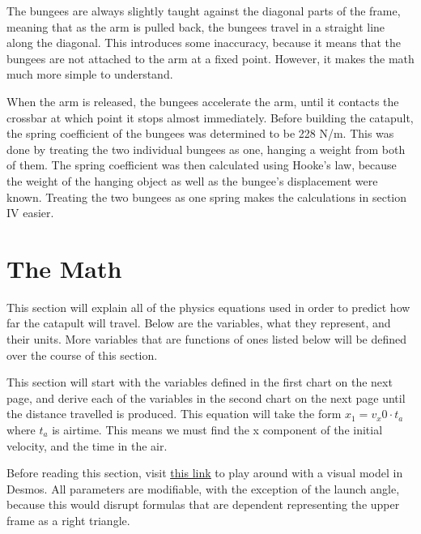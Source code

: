 \documentclass[10pt]{article}
\begin{document}
\begin{flushleft}
    \par
    The bungees are always slightly taught against the diagonal parts of the frame, meaning that as the arm is pulled back, the bungees travel in a straight line along the diagonal.
    This introduces some inaccuracy, because it means that the bungees are not attached to the arm at a fixed point.
    However, it makes the math much more simple to understand.

    \par
    When the arm is released, the bungees accelerate the arm, until it contacts the crossbar at which point it stops almost immediately.
    Before building the catapult, the spring coefficient of the bungees was determined to be 228 N/m.
    This was done by treating the two individual bungees as one, hanging a weight from both of them.
    The spring coefficient was then calculated using Hooke's law, because the weight of the hanging object as well as the bungee's displacement were known.
    Treating the two bungees as one spring makes the calculations in section IV easier.


  \section{The Math}

    This section will explain all of the physics equations used in order to predict how far the catapult will travel.
    Below are the variables, what they represent, and their units.
    More variables that are functions of ones listed below will be defined over the course of this section.
    
    \par
    This section will start with the variables defined in the first chart on the next page, and derive each of the variables in the second chart on the next page until the distance travelled is produced.
    This equation will take the form $x_1 = v_x0 \cdot t_a$ where $t_a$ is airtime.
    This means we must find the x component of the initial velocity, and the time in the air.

    \par
    Before reading this section, visit \href{https://www.desmos.com/calculator/lioxjeyth8}{\underline{this link}} to play around with a visual model in Desmos. 
    All parameters are modifiable, with the exception of the launch angle, because this would disrupt formulas that are dependent representing the upper frame as a right triangle.


\end{flushleft}
\end{document}
